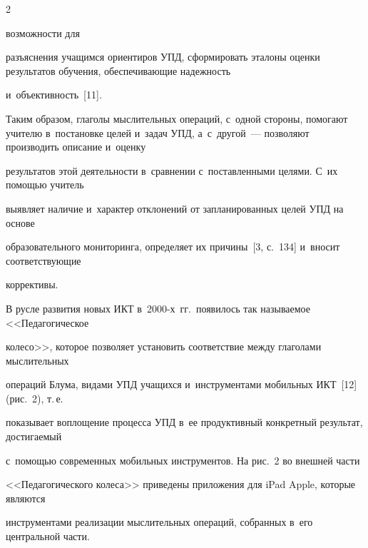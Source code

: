 \begin{multicols}{2}
\begin{center}
 \end{center}







\addtocounter{figure}{1}





\noindent


 возможности для


 разъяснения учащимся ориентиров УПД, сформировать эталоны оценки результатов обучения, обеспечивающие надежность


и~объективность~[11].











  Таким образом, глаголы мыслительных операций, с~одной стороны, помогают учителю в~постановке целей и~задач УПД, а~с~другой~--- позволяют производить описание и~оценку


результатов этой деятельности в~сравнении с~поставленными целями. С~их помощью учитель


выявляет наличие и~характер отклонений от запланированных целей УПД на основе


образовательного мониторинга, определяет их причины~[3, с.~134] и~вносит соответствующие


коррективы.





  В русле развития новых ИКТ в~2000-х~гг.\ появилось так называемое <<Педагогическое


колесо>>, которое позволяет установить соответствие между глаголами мыслительных


операций Блума, видами УПД учащихся и~инструментами мобильных ИКТ~[12] (рис.~2), т.\,е.\


показывает воплощение процесса УПД в~ее продуктивный конкретный результат, достигаемый


с~помощью современных мобильных инструментов. На рис.~2 во внешней части


<<Педагогического колеса>> приведены приложения для iPad Apple, которые являются


инструментами реализации мыслительных операций, собранных в~его центральной части.












\end{multicols}

